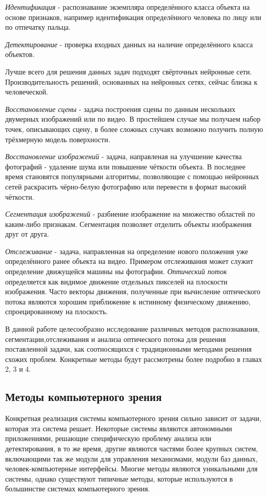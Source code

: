 \documentclass[specification,annotation,times]{itmo-student-thesis}
\begin{document}
\textit{Идентификация} - распознавание экземпляра определённого класса объекта на основе признаков, например идентификация определённого человека по лицу или по отпечатку пальца.

\textit{Детектирование} - проверка входных данных на наличие определённого класса объектов. 

Лучше всего для решения данных задач подходят свёрточных нейронные сети. Производительность решений, основанных на нейронных сетях, сейчас близка к человеческой. 

\textit{Восстановление сцены } - задача построения сцены по данным нескольких двумерных изображений или по видео. В простейшем случае мы получаем набор точек, описывающих сцену, в более сложных случаях возможно получить полную трёхмерную модель поверхности. 

\textit{Восстановление изображений} - задача, направленая на улучшение качества фотографий - удаление шума или повышение чёткости объекта. В последнее время становятся популярными алгоритмы, позволяющие с помощью нейронных сетей раскрасить чёрно-белую фотографию или перевести в формат высокий чёткости.

\textit{Сегментация изображений} - разбиение изображение на множество областей по каким-либо признакам. Сегментация позволяет отделить объекты изображения друг от друга. 

\textit{Отслеживание } - задача, направленная на определение нового положения уже определённого ранее объекта на видео. Примером отслеживания  может служит определение движущейся машины ны фотографии.
\textit{Оптический поток} определяется как видимое движение отдельных пикселей на плоскости изображения. Часто векторы движения, полученные при вычисление оптического потока являются хорошим приближение к истинному физическому движению, спроецированному на плоскость.

В данной работе целесообразно исследование различных методов распознавания, сегментации,отслеживания и анализа оптического потока для решения поставленной задачи, как соотносящихся с традиционными методами решения схожих проблем. Конкретные методы будут рассмотрены более подробно в главах 2, 3 и 4.
\subsection{Методы компьютерного зрения}\label{cvmethods}

Конкретная реализация системы компьютерного зрения сильно зависит от задачи, которая эта система решает. Некоторые системы являются автономными приложениями, решающие специфическую проблему анализа или детектирования, в то же время, другие являются частями более крупных систем, включающими так же модули для управления механизмами, модули баз данных, человек-компьютерные интерфейсы.
Многие методы являются уникальными для системы, однако существуют типичные методы, которые используются в большинстве системах компьютерного зрения.
\end{document}
